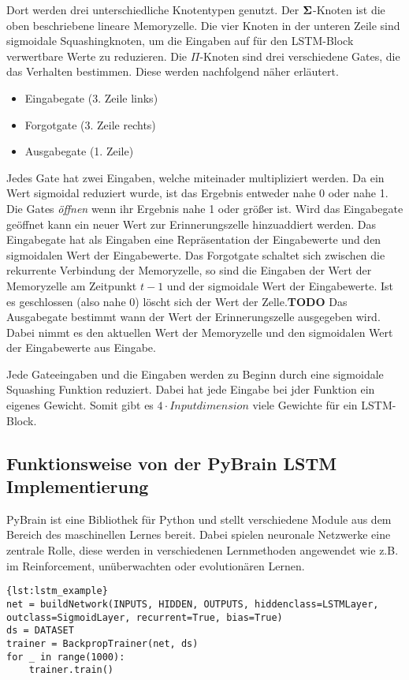  Dort werden
drei unterschiedliche Knotentypen genutzt. Der $\bf\Sigma$-Knoten ist die oben
beschriebene lineare Memoryzelle. Die vier Knoten in der unteren Zeile sind
sigmoidale Squashingknoten, um die Eingaben auf für den \ac{LSTM}-Block
verwertbare Werte zu reduzieren. Die $\Pi$-Knoten sind drei verschiedene Gates,
die das Verhalten bestimmen. Diese werden nachfolgend näher erläutert.
\begin{itemize}
	\item Eingabegate (3. Zeile links)
	\item Forgotgate (3. Zeile rechts)
	\item Ausgabegate (1. Zeile)
\end{itemize}
Jedes Gate hat zwei Eingaben, welche miteinader multipliziert werden. Da ein
Wert sigmoidal reduziert wurde, ist das Ergebnis entweder nahe 0 oder nahe 1.
Die Gates \textit{öffnen} wenn ihr Ergebnis nahe 1 oder größer ist. Wird das
Eingabegate geöffnet kann ein neuer Wert zur Erinnerungszelle hinzuaddiert
werden. Das Eingabegate hat als Eingaben eine Repräsentation der Eingabewerte
und den sigmoidalen Wert der Eingabewerte. Das Forgotgate schaltet sich zwischen die
rekurrente Verbindung der Memoryzelle, so sind die Eingaben der Wert der
Memoryzelle am Zeitpunkt $t-1$ und der sigmoidale Wert der Eingabewerte. Ist es
geschlossen (also nahe 0) löscht sich der Wert der Zelle.\textbf{TODO} Das 
Ausgabegate bestimmt wann der Wert der Erinnerungszelle ausgegeben wird. Dabei
nimmt es den aktuellen Wert der Memoryzelle und den sigmoidalen Wert der
Eingabewerte aus Eingabe. 

Jede Gateeingaben und die Eingaben werden zu Beginn durch eine sigmoidale
Squashing Funktion reduziert. Dabei hat jede Eingabe bei jder Funktion ein
eigenes Gewicht. Somit gibt es $4\cdot Inputdimension$ viele Gewichte für ein
\ac{LSTM}-Block. 

\subsection{Funktionsweise von der \acs{PyBrain} \acs{LSTM} Implementierung}
\ac{PyBrain}\cite{schaul2010} ist eine Bibliothek für Python und stellt
verschiedene Module aus dem Bereich des maschinellen Lernes bereit. Dabei
spielen neuronale Netzwerke eine zentrale Rolle, diese werden in verschiedenen
Lernmethoden angewendet wie z.B. im Reinforcement, unüberwachten oder
evolutionären Lernen.

\begin{lstlisting}[caption={Aufbau eines LSTM Netzes},label={lst:lstm_example}]{lst:lstm_example} 
net = buildNetwork(INPUTS, HIDDEN, OUTPUTS, hiddenclass=LSTMLayer,
outclass=SigmoidLayer, recurrent=True, bias=True) 
ds = DATASET 
trainer = BackpropTrainer(net, ds)
for _ in range(1000):
    trainer.train()
\end{lstlisting}

